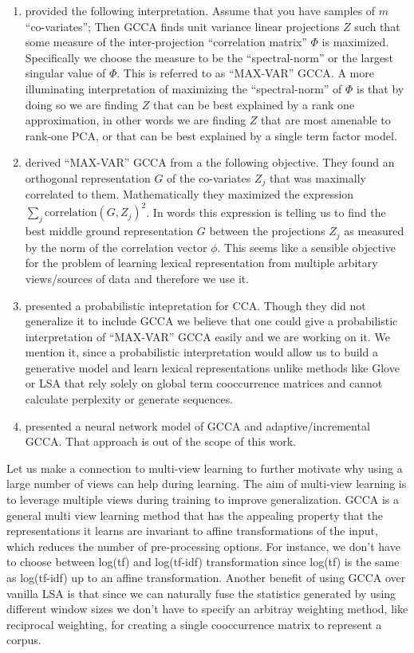\documentclass[11pt]{article}
\begin{document}
\begin{enumerate}[leftmargin=*]
\item \cite{horst1961generalized} provided the following
  interpretation. Assume that you have samples of $m$
  ``co-variates''; Then GCCA finds unit variance linear
  projections $Z$ such that some measure of the inter-projection ``correlation
  matrix'' $\Phi$ is maximized. Specifically we choose the measure to be
  the ``spectral-norm'' or the largest singular value of $\Phi$. This
  is referred to as ``MAX-VAR'' GCCA. A more illuminating
  interpretation of maximizing the ``spectral-norm'' of $\Phi$ is that
  by doing so we are finding $Z$ that can be best explained by a rank
  one approximation, in other words we are finding $Z$ that are most
  amenable to rank-one PCA, or that can be best explained by a single
  term factor model.
\item \cite{carroll1968generalization} derived ``MAX-VAR'' GCCA from a
  the following objective. They found an orthogonal
  representation $G$ of the co-variates $Z_j$ that was maximally
  correlated to them. Mathematically they maximized
   the expression $\sum_j \textrm{correlation}(G, Z_j)^2$. In words
   this expression is telling us to find the best middle ground
   representation $G$ between the projections $Z_j$ as measured by the
   norm of the correlation vector $\phi$. This seems like a sensible
   objective for the problem of learning lexical representation from
   multiple arbitary views/sources of data and therefore
   we use it.
\item \cite{bach2005probabilistic} presented a probabilistic
  intepretation for CCA. Though they did not generalize it to
  include GCCA we believe that one could give a probabilistic
  interpretation of ``MAX-VAR'' GCCA easily and we are working on
  it. We mention it, since a probabilistic
  interpretation would allow us to build a generative model and learn
  lexical representations unlike methods like Glove or LSA that rely
  solely on global term cooccurrence matrices and cannot calculate
  perplexity or generate sequences.
\item \cite{via2007learning} presented a neural network model of GCCA and
  adaptive/incremental GCCA. That approach is out of the scope of this work.
\end{enumerate}

Let us make a connection to multi-view learning to further motivate
why using a large number of views can help during learning. The aim of
multi-view learning is to leverage multiple views during training to
improve generalization. GCCA is a general multi view learning method that has the appealing
property that the representations it learns are invariant to affine
transformations of the input, which reduces the number of
pre-processing options. For instance, we don't have to choose 
between log(tf) and log(tf-idf) transformation since log(tf) is the
same as log(tf-idf) up to an affine transformation. Another benefit of
using GCCA over vanilla LSA is that since we can naturally 
fuse the statistics generated by using different window sizes we
don't have to specify an arbitray weighting method, like reciprocal
weighting, for creating a single cooccurrence matrix to represent a
corpus.
\end{document}
